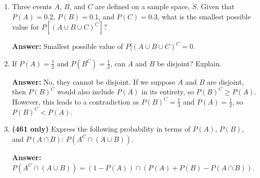 \documentclass{article}
\begin{document}
\begin{enumerate}
         \item Three events $A$, $B$, and $C$ are deﬁned on a sample space, $S$. Given that $P(A)=0.2$, $P(B)=0.1$, and $P(C)=0.3$, what is the smallest possible value for $P[(A \cup B \cup C)^C]$?
    
            \textbf{Answer:} Smallest possible value of $P[(A \cup B \cup C)^C = 0$.\\
            
        \item If $P(A) = \frac{1}{2}$ and $P(B^C) = \frac{1}{3}$, can $A$ and $B$ be disjoint? Explain.
        
            \textbf{Answer:} No, they cannot be disjoint. If we suppose $A$ and $B$ are disjoint, then $P(B)^C$ would also include $P(A)$ in its entirety, so $P(B)^C \geq P(A)$. However, this leads to a contradiction as $P(B)^C = \frac{1}{3}$ and $P(A) = \frac{1}{2}$, so $P(B)^C < P(A)$.\\
            
         \item \textbf{(461 only)} Express the following probability in terms of $P(A)$, $P(B)$, and $P(A \cap B)$: $P(A^C \cap (A \cup B))$.
         
            \textbf{Answer:} $P(A^C \cap (A \cup B)) = (1 - P(A)) \cap (P(A) + P(B) - P(A \cap B))$.
    \end{enumerate}
\end{document}
